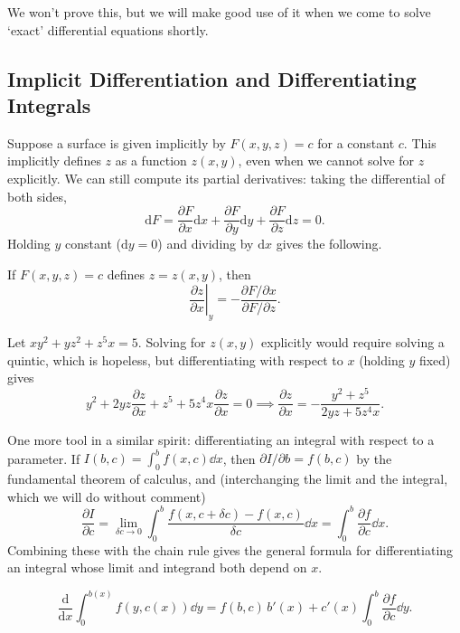 \documentclass[a4paper]{scrartcl}
\begin{document}
We won't prove this, but we will make good use of it when we come to solve `exact' differential equations shortly.

\subsection{Implicit Differentiation and Differentiating Integrals}

Suppose a surface is given implicitly by $F(x, y, z) = c$ for a constant $c$. This implicitly defines $z$ as a function $z(x, y)$, even when we cannot solve for $z$ explicitly. We can still compute its partial derivatives: taking the differential of both sides,
$$
\mathrm{d}F = \frac{\partial F}{\partial x} \mathrm{d}x + \frac{\partial F}{\partial y}\mathrm{d}y + \frac{\partial F}{\partial z}\mathrm{d}z = 0.
$$
Holding $y$ constant ($\mathrm{d}y = 0$) and dividing by $\mathrm{d}x$ gives the following.

\begin{proposition}
	If $F(x, y, z) = c$ defines $z = z(x, y)$, then
	$$
	\left.\frac{\partial z}{\partial x}\right|_y = -\frac{\partial F/\partial x}{\partial F/\partial z}.
	$$
\end{proposition}

\begin{example}
	Let $xy^2 + yz^2 + z^5 x = 5$. Solving for $z(x, y)$ explicitly would require solving a quintic, which is hopeless, but differentiating with respect to $x$ (holding $y$ fixed) gives
	$$
	y^2 + 2yz \frac{\partial z}{\partial x} + z^5 + 5z^4 x \frac{\partial z}{\partial x} = 0
	\implies \frac{\partial z}{\partial x} = -\frac{y^2 + z^5}{2yz + 5z^4 x}.
	$$
\end{example}

One more tool in a similar spirit: differentiating an integral with respect to a parameter. If $I(b, c) = \int_0^b f(x, c) \dd x$, then $\partial I/\partial b = f(b, c)$ by the fundamental theorem of calculus, and (interchanging the limit and the integral, which we will do without comment)
$$
\frac{\partial I}{\partial c} = \lim_{\delta c \to 0} \int_0^b \frac{f(x, c + \delta c) - f(x, c)}{\delta c} \dd x = \int_0^b \frac{\partial f}{\partial c} \dd x.
$$
Combining these with the chain rule gives the general formula for differentiating an integral whose limit and integrand both depend on $x$.

\begin{theorem}
	$$
	\frac{\mathrm{d}}{\mathrm{d}x} \int_0^{b(x)} f(y, c(x)) \dd y = f(b, c) \, b'(x) + c'(x)\int_0^{b} \frac{\partial f}{\partial c} \dd y.
	$$
\end{theorem}
\end{document}
